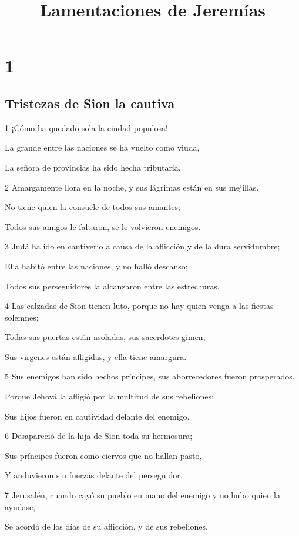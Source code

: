

\title{Lamentaciones de Jeremías}

\chapter{1}

\section*{Tristezas de Sion la cautiva}

\par 1 ¡Cómo ha quedado sola la ciudad populosa!
\par La grande entre las naciones se ha vuelto como viuda,
\par La señora de provincias ha sido hecha tributaria.
\par 2 Amargamente llora en la noche, y sus lágrimas están en sus mejillas.
\par No tiene quien la consuele de todos sus amantes;
\par Todos sus amigos le faltaron, se le volvieron enemigos.
\par 3 Judá ha ido en cautiverio a causa de la aflicción y de la dura servidumbre;
\par Ella habitó entre las naciones, y no halló descanso;
\par Todos sus perseguidores la alcanzaron entre las estrechuras.
\par 4 Las calzadas de Sion tienen luto, porque no hay quien venga a las fiestas solemnes;
\par Todas sus puertas están asoladas, sus sacerdotes gimen,
\par Sus vírgenes están afligidas, y ella tiene amargura.
\par 5 Sus enemigos han sido hechos príncipes, sus aborrecedores fueron prosperados,
\par Porque Jehová la afligió por la multitud de sus rebeliones;
\par Sus hijos fueron en cautividad delante del enemigo.
\par 6 Desapareció de la hija de Sion toda su hermosura;
\par Sus príncipes fueron como ciervos que no hallan pasto,
\par Y anduvieron sin fuerzas delante del perseguidor.
\par 7 Jerusalén, cuando cayó su pueblo en mano del enemigo y no hubo quien la ayudase,
\par Se acordó de los días de su aflicción, y de sus rebeliones,

